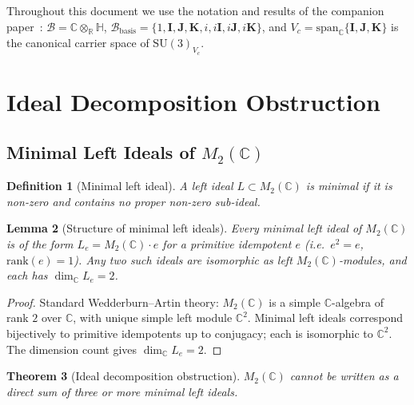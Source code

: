 \documentclass[12pt,a4paper]{article}
\newtheorem{theorem}{Theorem}[section]
\newtheorem{lemma}[theorem]{Lemma}
\newtheorem{definition}[theorem]{Definition}
\theoremstyle{remark}
\begin{document}
Throughout this document we use the notation and results of the companion
paper~\cite{su3triplet}: $\mathcal{B}=\mathbb{C}\otimes_\mathbb{R}\mathbb{H}$,
$\mathcal{B}_{\mathrm{basis}} = \{1,\mathbf{I},\mathbf{J},\mathbf{K},
i,i\mathbf{I},i\mathbf{J},i\mathbf{K}\}$, and $V_c =
\mathrm{span}_\mathbb{C}\{\mathbf{I},\mathbf{J},\mathbf{K}\}$ is the canonical
carrier space of $\mathrm{SU}(3)_{V_c}$.

\section{Ideal Decomposition Obstruction}
\label{sec:ideals}

\subsection{Minimal Left Ideals of $M_2(\mathbb{C})$}

\begin{definition}[Minimal left ideal]
  A left ideal $L \subset M_2(\mathbb{C})$ is \emph{minimal} if it is
  non-zero and contains no proper non-zero sub-ideal.
\end{definition}

\begin{lemma}[Structure of minimal left ideals]
  \label{lem:mli_structure}
  Every minimal left ideal of $M_2(\mathbb{C})$ is of the form
  $L_e = M_2(\mathbb{C})\cdot e$ for a primitive idempotent $e$
  (i.e.\ $e^2 = e$, $\mathrm{rank}(e) = 1$).
  Any two such ideals are isomorphic as left $M_2(\mathbb{C})$-modules,
  and each has $\dim_\mathbb{C} L_e = 2$.
\end{lemma}

\begin{proof}
  Standard Wedderburn--Artin theory: $M_2(\mathbb{C})$ is a simple
  $\mathbb{C}$-algebra of rank $2$ over $\mathbb{C}$, with unique simple
  left module $\mathbb{C}^2$.  Minimal left ideals correspond bijectively to
  primitive idempotents up to conjugacy; each is isomorphic to $\mathbb{C}^2$.
  The dimension count gives $\dim_\mathbb{C} L_e = 2$.
\end{proof}

\begin{theorem}[Ideal decomposition obstruction]
  \label{thm:ideal_obstruction}
  $M_2(\mathbb{C})$ cannot be written as a direct sum of three or more
  minimal left ideals.
\end{theorem}
\end{document}
